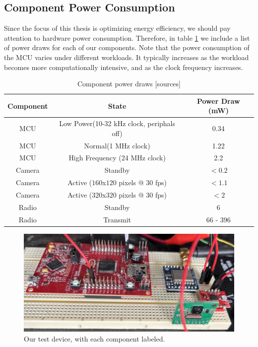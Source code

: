 \documentclass[twoside]{report}
\begin{document}
\subsection{Component Power Consumption}
Since the focus of this thesis is optimizing energy efficiency, we should pay attention to hardware power 
consumption. Therefore, in table \ref{tab:power} we include a list of power draws for each of our components. 
Note that the power consumption of the MCU varies under different workloads. It typically increases as the workload becomes more computationally 
intensive, and as the clock frequency increases.

\begin{table}[ht]
\begin{center}
    \begin{tabular}{ |c|c|c| } 
     \hline
     \textbf{Component} & \textbf{State} & \textbf{Power Draw (mW)} \\
     \hline
     MCU & Low Power(10-32 kHz clock, periphals off) & 0.34 \\ 
     \hline
     MCU & Normal(1 MHz clock) & 1.22 \\ 
     \hline
     MCU & High Frequency (24 MHz clock) & 2.2 \\ 
     \hline
     Camera & Standby & $< 0.2$ \\
     \hline
     Camera & Active ($160$x$120$ pixels @ $30$ fps) & $< 1.1$ \\
     \hline
     Camera & Active ($320$x$320$ pixels @ $30$ fps) & $< 2$ \\
     \hline
     Radio & Standby & 6 \\
     \hline
     Radio & Transmit & 66 - 396 \\
     \hline
    \end{tabular}
    \caption{Component power draws [sources]}
\end{center} \label{tab:power}
\end{table}

\begin{figure}[ht]
    \centering
    \includegraphics[width=0.8\linewidth]{method/device.jpg}
    \caption{Our test device, with each component labeled.}
    \label{fig:device}
\end{figure}
\end{document}
